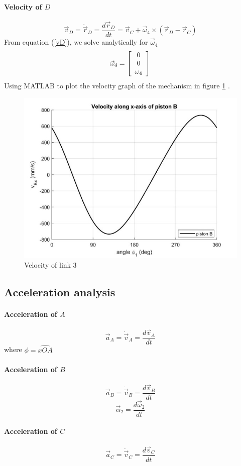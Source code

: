 \paragraph{Velocity of $ D $}
\begin{equation}\label{vD}
\vec{v}_D=\dot{\vec{r}}_D=\dfrac{d\vec{r}_D}{dt}=\vec{v}_C+\vec{\omega}_4\times(\vec{r}_D-\vec{r}_C)
\end{equation}
From equation (\ref{vD}), we solve analytically for $ \vec{\omega}_4 $
\[\vec{\omega}_4=\left[ \begin{array}{c} 0\\ 0\\ \omega_4 \end{array}\right]\]
Using MATLAB\textup{\textregistered} to plot the velocity graph of the mechanism in figure \ref{fig:06} \cite{marghitu_2009_mechanisms}. \clearpage
\begin{figure}[h]
	\centering
	\includegraphics[width=0.7\linewidth]{06}
	\caption{Velocity of link 3}
	\label{fig:06}
\end{figure}
\subsection{Acceleration analysis}
\paragraph{Acceleration of $ A $}
\begin{equation}\label{aA}
\vec{a}_A=\dot{\vec{v}}_A=\dfrac{d\vec{v}_A}{dt}
\end{equation}
where $ \phi=\widehat{xOA} $
\paragraph{Acceleration of $ B $}
\begin{equation}\label{aB}
\vec{a}_B=\dot{\vec{v}}_B=\dfrac{d\vec{v}_B}{dt}
\end{equation}
\[\vec{\alpha}_2=\dfrac{d\vec{\omega}_2}{dt}\]
\paragraph{Acceleration of $ C $}
\begin{equation}\label{aC}
\vec{a}_C=\dot{\vec{v}}_C=\dfrac{d\vec{v}_C}{dt}
\end{equation}
